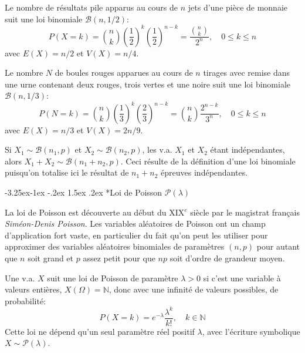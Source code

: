 \documentclass[]{book}
\makeatletter
\renewcommand\subsection{\@startsection{subsection}{2}{\z@}%
                                     {-3.25ex\@plus -1ex \@minus -.2ex}%
                                     {1.5ex \@plus .2ex}%
                                     {\normalfont\large\bfseries\color{Violet}}}
\theoremstyle{magentacolor}
\theoremstyle{proprie}
\theoremstyle{exstyle}
\theoremstyle{exostyle}
\theoremstyle{definition}
\theoremstyle{definition}
\theoremstyle{definition}
\theoremstyle{remark}
\let\BeginKnitrBlock\begin \let\EndKnitrBlock\end
\makeatother
\begin{document}
Le nombre de résultats pile apparus au cours de \(n\) jets d'une pièce de
monnaie suit une loi binomiale \(\mathcal{B} \left({n, 1/2}\right)\):
\[P(X=k)=\binom{n}{k}\left(\frac{1}{2}\right)^k \left(\frac{1}{2}\right)^{n-k}=\frac{\binom{n}{k}}{2^n}, \quad 0\leq k \leq n\]
avec \(E(X)=n/2\) et \(V(X)=n/4\).

Le nombre \(N\) de boules rouges apparues au cours de \(n\) tirages avec
remise dans une urne contenant deux rouges, trois vertes et une noire
suit une loi binomiale \(\mathcal{B} \left({n, 1/3}\right)\):
\[P(N=k)=\binom{n}{k}\left(\frac{1}{3}\right)^k \left(\frac{2}{3}\right)^{n-k}=\binom{n}{k} \frac{2^{n-k}}{3^n}, \quad 0\leq k \leq n\]
avec \(E(X)=n/3\) et \(V(X)=2n/9\).

\BeginKnitrBlock{theorem}
\protect\hypertarget{thm:unnamed-chunk-27}{}{\label{thm:unnamed-chunk-27} }Si \(X_1 \sim \mathcal{B} \left({n_1, p}\right)\) et
\(X_2 \sim \mathcal{B} \left({n_2, p}\right)\), les v.a. \(X_1\) et \(X_2\)
étant indépendantes, alors
\(X_1+X_2 \sim \mathcal{B} \left({n_1+n_2, p}\right)\). Ceci résulte de la
définition d'une loi binomiale puisqu'on totalise ici le résultat de
\(n_1+n_2\) épreuves indépendantes.
\EndKnitrBlock{theorem}

\hypertarget{loi-de-poisson-mathcalplambda}{%
\subsection*{\texorpdfstring{Loi de Poisson \(\mathcal{P}(\lambda)\)}{Loi de Poisson \textbackslash mathcal\{P\}(\textbackslash lambda)}}\label{loi-de-poisson-mathcalplambda}}

\BeginKnitrBlock{rmdtip}
La loi de Poisson est découverte au début du XIX\(^e\) siècle par le
magistrat français \emph{Siméon-Denis Poisson}. Les variables aléatoires
de Poisson ont un champ d'application fort vaste, en particulier du
fait qu'on peut les utiliser pour approximer des variables
aléatoires binomiales de paramètres \((n,p)\) pour autant que \(n\) soit
grand et \(p\) assez petit pour que \(np\) soit d'ordre de grandeur
moyen.
\EndKnitrBlock{rmdtip}

\BeginKnitrBlock{definition}
\protect\hypertarget{def:unnamed-chunk-29}{}{\label{def:unnamed-chunk-29} }Une v.a. \(X\) suit une loi de Poisson de paramètre \(\lambda>0\) si c'est
une variable à valeurs entières, \(X(\Omega)=\mathbb{N}\), donc avec une
infinité de valeurs possibles, de probabilité: \[\label{eq:poisson}
    P(X=k)=e^{-\lambda} \frac{\lambda^k}{k!}, \quad k \in \mathbb{N}\]
Cette loi ne dépend qu'un seul paramètre réel positif \(\lambda\), avec
l'écriture symbolique \(X \sim \mathcal{P}(\lambda)\).
\EndKnitrBlock{definition}
\end{document}
